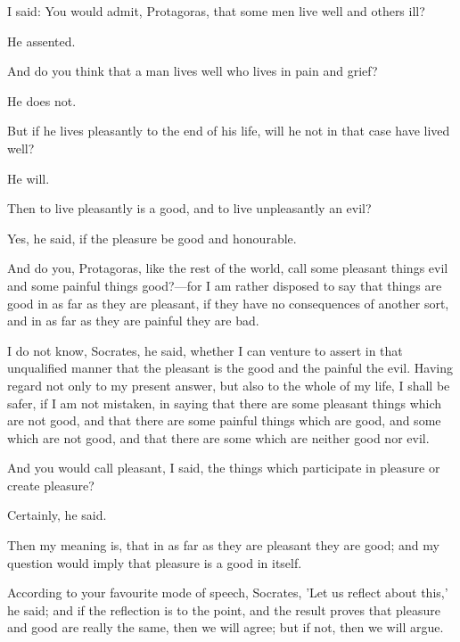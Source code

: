 \documentclass[11pt,letter]{article}
\begin{document}
\par  I said: You would admit, Protagoras, that some men live well and others ill?

\par  He assented.

\par  And do you think that a man lives well who lives in pain and grief?

\par  He does not.

\par  But if he lives pleasantly to the end of his life, will he not in that case have lived well?

\par  He will.

\par  Then to live pleasantly is a good, and to live unpleasantly an evil?

\par  Yes, he said, if the pleasure be good and honourable.

\par  And do you, Protagoras, like the rest of the world, call some pleasant things evil and some painful things good?—for I am rather disposed to say that things are good in as far as they are pleasant, if they have no consequences of another sort, and in as far as they are painful they are bad.

\par  I do not know, Socrates, he said, whether I can venture to assert in that unqualified manner that the pleasant is the good and the painful the evil. Having regard not only to my present answer, but also to the whole of my life, I shall be safer, if I am not mistaken, in saying that there are some pleasant things which are not good, and that there are some painful things which are good, and some which are not good, and that there are some which are neither good nor evil.

\par  And you would call pleasant, I said, the things which participate in pleasure or create pleasure?

\par  Certainly, he said.

\par  Then my meaning is, that in as far as they are pleasant they are good; and my question would imply that pleasure is a good in itself.

\par  According to your favourite mode of speech, Socrates, 'Let us reflect about this,' he said; and if the reflection is to the point, and the result proves that pleasure and good are really the same, then we will agree; but if not, then we will argue.
\end{document}
